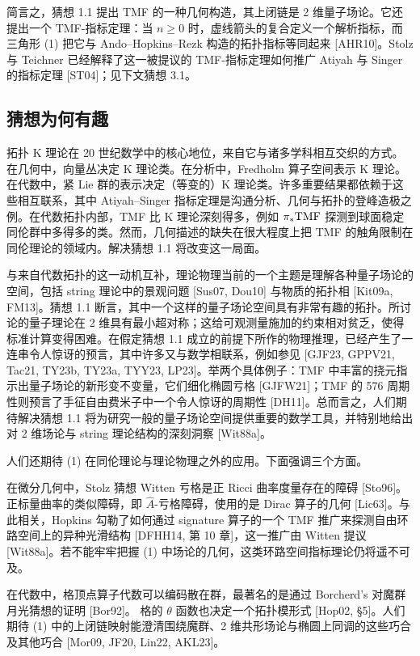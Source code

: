 简言之，猜想 1.1 提出 TMF 的一种几何构造，其上闭链是 2 维量子场论。它还提出一个 TMF-指标定理：当 $n\ge 0$ 时，虚线箭头的复合定义一个解析指标，而三角形 (1) 把它与 Ando–Hopkins–Rezk 构造的拓扑指标等同起来 [AHR10]。Stolz 与 Teichner 已经解释了这一被提议的 TMF-指标定理如何推广 Atiyah 与 Singer 的指标定理 [ST04]；见下文猜想 3.1。

\subsection{猜想为何有趣}
拓扑 K 理论在 20 世纪数学中的核心地位，来自它与诸多学科相互交织的方式。在几何中，向量丛决定 K 理论类。在分析中，Fredholm 算子空间表示 K 理论。在代数中，紧 Lie 群的表示决定（等变的）K 理论类。许多重要结果都依赖于这些相互联系，其中 Atiyah–Singer 指标定理是沟通分析、几何与拓扑的登峰造极之例。在代数拓扑内部，TMF 比 K 理论深刻得多，例如 $\pi_*\mathrm{TMF}$ 探测到球面稳定同伦群中多得多的类。然而，几何描述的缺失在很大程度上把 TMF 的触角限制在同伦理论的领域内。解决猜想 1.1 将改变这一局面。

与来自代数拓扑的这一动机互补，理论物理当前的一个主题是理解各种量子场论的空间，包括 string 理论中的景观问题 [Sus07, Dou10] 与物质的拓扑相 [Kit09a, FM13]。猜想 1.1 断言，其中一个这样的量子场论空间具有非常有趣的拓扑。所讨论的量子理论在 2 维具有最小超对称；这给可观测量施加的约束相对贫乏，使得标准计算变得困难。在假定猜想 1.1 成立的前提下所作的物理推理，已经产生了一连串令人惊讶的预言，其中许多又与数学相联系，例如参见 [GJF23, GPPV21, Tac21, TY23b, TY23a, TYY23, LP23]。举两个具体例子：TMF 中丰富的挠元指示出量子场论的新形变不变量，它们细化椭圆亏格 [GJFW21]；TMF 的 576 周期性则预言了手征自由费米子中一个令人惊讶的周期性 [DH11]。总而言之，人们期待解决猜想 1.1 将为研究一般的量子场论空间提供重要的数学工具，并特别地给出对 2 维场论与 string 理论结构的深刻洞察 [Wit88a]。

人们还期待 (1) 在同伦理论与理论物理之外的应用。下面强调三个方面。

在微分几何中，Stolz 猜想 Witten 亏格是正 Ricci 曲率度量存在的障碍 [Sto96]。正标量曲率的类似障碍，即 $\hat{A}$-亏格障碍，使用的是 Dirac 算子的几何 [Lic63]。与此相关，Hopkins 勾勒了如何通过 signature 算子的一个 TMF 推广来探测自由环路空间上的异种光滑结构 [DFHH14, 第 10 章]，这一推广由 Witten 提议 [Wit88a]。若不能牢牢把握 (1) 中场论的几何，这类环路空间指标理论仍将遥不可及。

在代数中，格顶点算子代数可以编码散在群，最著名的是通过 Borcherd's 对魔群月光猜想的证明 [Bor92]。
格的 $\theta$ 函数也决定一个拓扑模形式 [Hop02, §5]。人们期待 (1) 中的上闭链映射能澄清围绕魔群、2 维共形场论与椭圆上同调的这些巧合及其他巧合 [Mor09, JF20, Lin22, AKL23]。

